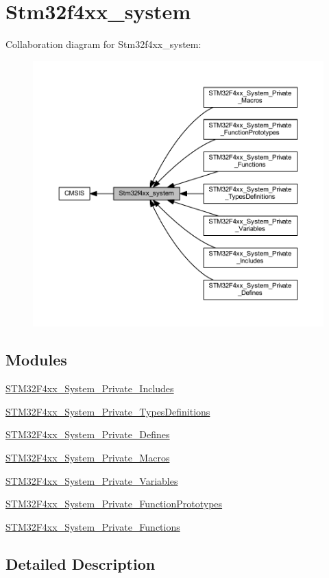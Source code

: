 \hypertarget{group__stm32f4xx__system}{}\section{Stm32f4xx\+\_\+system}
\label{group__stm32f4xx__system}
Collaboration diagram for Stm32f4xx\+\_\+system\+:\nopagebreak
\begin{figure}[H]
\begin{center}
\leavevmode
\includegraphics[width=350pt]{group__stm32f4xx__system}
\end{center}
\end{figure}
\subsection*{Modules}
\begin{DoxyCompactItemize}
\item 
\mbox{\hyperlink{group___s_t_m32_f4xx___system___private___includes}{S\+T\+M32\+F4xx\+\_\+\+System\+\_\+\+Private\+\_\+\+Includes}}
\item 
\mbox{\hyperlink{group___s_t_m32_f4xx___system___private___types_definitions}{S\+T\+M32\+F4xx\+\_\+\+System\+\_\+\+Private\+\_\+\+Types\+Definitions}}
\item 
\mbox{\hyperlink{group___s_t_m32_f4xx___system___private___defines}{S\+T\+M32\+F4xx\+\_\+\+System\+\_\+\+Private\+\_\+\+Defines}}
\item 
\mbox{\hyperlink{group___s_t_m32_f4xx___system___private___macros}{S\+T\+M32\+F4xx\+\_\+\+System\+\_\+\+Private\+\_\+\+Macros}}
\item 
\mbox{\hyperlink{group___s_t_m32_f4xx___system___private___variables}{S\+T\+M32\+F4xx\+\_\+\+System\+\_\+\+Private\+\_\+\+Variables}}
\item 
\mbox{\hyperlink{group___s_t_m32_f4xx___system___private___function_prototypes}{S\+T\+M32\+F4xx\+\_\+\+System\+\_\+\+Private\+\_\+\+Function\+Prototypes}}
\item 
\mbox{\hyperlink{group___s_t_m32_f4xx___system___private___functions}{S\+T\+M32\+F4xx\+\_\+\+System\+\_\+\+Private\+\_\+\+Functions}}
\end{DoxyCompactItemize}


\subsection{Detailed Description}
